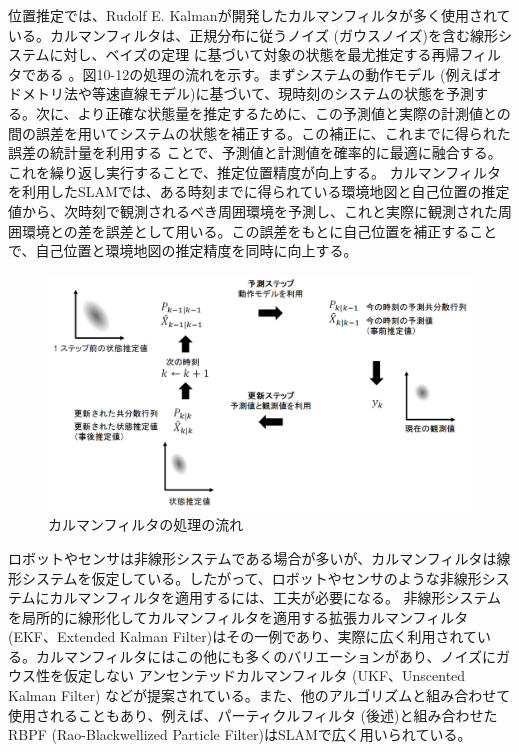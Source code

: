 位置推定では、Rudolf E. Kalmanが開発したカルマンフィルタが多く使用されている。カルマンフィルタは、正規分布に従うノイズ (ガウスノイズ)を含む線形システムに対し、ベイズの定理 に基づいて対象の状態を最尤推定する再帰フィルタである 。図10-12の処理の流れを示す。まずシステムの動作モデル  (例えばオドメトリ法や等速直線モデル)に基づいて、現時刻のシステムの状態を予測する。次に、より正確な状態量を推定するために、この予測値と実際の計測値との間の誤差を用いてシステムの状態を補正する。この補正に、これまでに得られた誤差の統計量を利用する ことで、予測値と計測値を確率的に最適に融合する。これを繰り返し実行することで、推定位置精度が向上する。
カルマンフィルタを利用したSLAMでは、ある時刻までに得られている環境地図と自己位置の推定値から、次時刻で観測されるべき周囲環境を予測し、これと実際に観測された周囲環境との差を誤差として用いる。この誤差をもとに自己位置を補正することで、自己位置と環境地図の推定精度を同時に向上する。

\begin{figure}[htp]
  \centering
  \includegraphics[width=\columnwidth]{pictures/chapter10/pic_10_12.png}
  \caption{カルマンフィルタの処理の流れ}
\end{figure}

ロボットやセンサは非線形システムである場合が多いが、カルマンフィルタは線形システムを仮定している。したがって、ロボットやセンサのような非線形システムにカルマンフィルタを適用するには、工夫が必要になる。 非線形システムを局所的に線形化してカルマンフィルタを適用する拡張カルマンフィルタ (EKF、Extended Kalman Filter)はその一例であり、実際に広く利用されている。カルマンフィルタにはこの他にも多くのバリエーションがあり、ノイズにガウス性を仮定しない アンセンテッドカルマンフィルタ (UKF、Unscented Kalman Filter)   などが提案されている。また、他のアルゴリズムと組み合わせて使用されることもあり、例えば、パーティクルフィルタ (後述)と組み合わせたRBPF (Rao-Blackwellized Particle Filter)はSLAMで広く用いられている。



